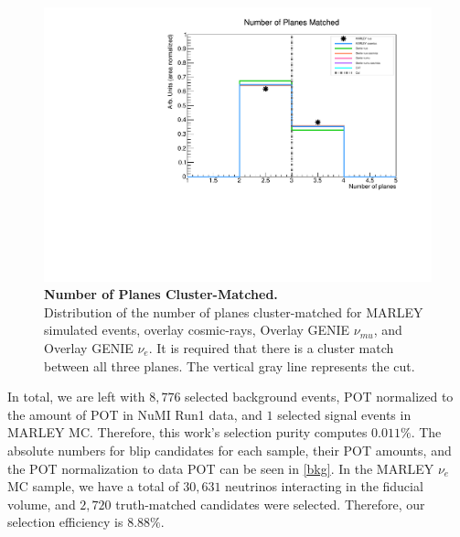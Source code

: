 \begin{figure}[h!]
    \centering
    \includegraphics[width=120mm]{Figures/blip_n_planes.pdf}
    \caption[Number of Planes Cluster-Matched.]{{\textbf{Number of Planes Cluster-Matched.}}\\ Distribution of the number of planes cluster-matched for MARLEY simulated events, overlay cosmic-rays, Overlay GENIE $\nu_{mu}$, and Overlay GENIE $\nu_{e}$. It is required that there is a cluster match between all three planes. The vertical gray line represents the cut.}
 \label{blip_nplanes}
\end{figure}

In total, we are left with $8,776$ selected background events, POT normalized to the amount of POT in NuMI Run1 data, and $1$ selected signal events in MARLEY MC. Therefore, this work's selection purity computes $0.011\%$. The absolute numbers for blip candidates for each sample, their POT amounts, and the POT normalization to data POT can be seen in \ref{bkg}. In the MARLEY $\nu_{e}$ MC sample, we have a total of $30,631$ neutrinos interacting in the fiducial volume, and $2,720$ truth-matched candidates were selected. Therefore, our selection efficiency is $8.88\%$.  

